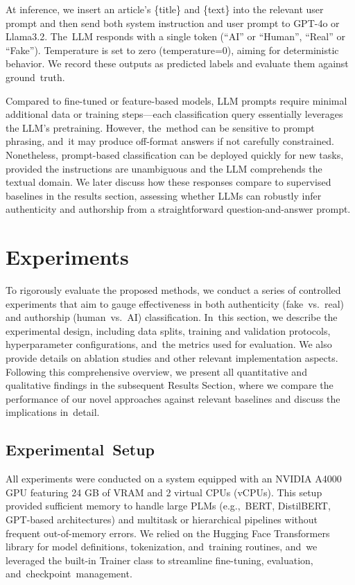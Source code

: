 \documentclass[electronics,article,accept,pdftex,moreauthors,electronics]{Definitions/mdpi}
\begin{document}
At inference, we insert an article’s \{title\} and \{text\} into the relevant user prompt and then send both system instruction and user prompt to GPT-4o or Llama3.2. The~LLM responds with a single token (``AI'' or ``Human'', ``Real'' or ``Fake''). Temperature is set to zero (temperature=0), aiming for deterministic behavior. We record these outputs as predicted labels and evaluate them against ground~truth.

Compared to fine-tuned or feature-based models, LLM prompts require minimal additional data or training steps---each classification query essentially leverages the LLM’s pretraining. However, the~method can be sensitive to prompt phrasing, and~it may produce off-format answers if not carefully constrained. Nonetheless, prompt-based classification can be deployed quickly for new tasks, provided the instructions are unambiguous and the LLM comprehends the textual domain. We later discuss how these responses compare to supervised baselines in the results section, assessing whether LLMs can robustly infer authenticity and authorship from a straightforward question-and-answer prompt.


\section{Experiments}\label{S5}

To rigorously evaluate the proposed methods, we conduct a series of controlled experiments that aim to gauge effectiveness in both authenticity (fake~vs.~real) and authorship (human~vs.~AI) classification. In~this section, we describe the experimental design, including data splits, training and validation protocols, hyperparameter configurations, and~the metrics used for evaluation. We also provide details on ablation studies and other relevant implementation aspects. Following this comprehensive overview, we present all quantitative and qualitative findings in the subsequent Results Section, where we compare the performance of our novel approaches against relevant baselines and discuss the implications in~detail.

\subsection{Experimental~Setup}

All experiments were conducted on a system equipped with an NVIDIA A4000 GPU featuring 24 GB of VRAM and 2 virtual CPUs (vCPUs). This setup provided sufficient memory to handle large PLMs (e.g.,~BERT, DistilBERT, GPT-based architectures) and multitask or hierarchical pipelines without frequent out-of-memory errors. We relied on the Hugging Face Transformers library for model definitions, tokenization, and~training routines, and~we leveraged the built-in Trainer class to streamline fine-tuning, evaluation, and~checkpoint~management.
\end{document}
